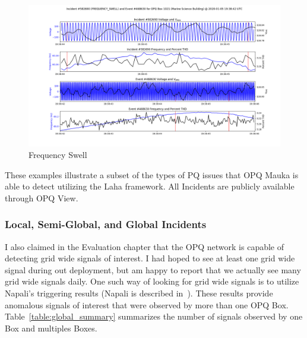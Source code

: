 \begin{figure}[H]
    \centering
    \includegraphics[width=\linewidth]{figures/incident-582690.png}
    \caption{Frequency Swell}
    \label{fig:fswell}
\end{figure}

These examples illustrate a subset of the types of PQ issues that OPQ Mauka is able to detect utilizing the Laha framework. All Incidents are publicly available through OPQ View.

\subsubsection{Local, Semi-Global, and Global Incidents}

I also claimed in the Evaluation chapter that the OPQ network is capable of detecting grid wide signals of interest. I had hoped to see at least one grid wide signal during out deployment, but am happy to report that we actually see many grid wide signals daily. One such way of looking for grid wide signals is to utilize Napali's triggering results (Napali is described in~\cite{napali}). These results provide anomalous signals of interest that were observed by more than one OPQ Box. Table~\ref{table:global_summary} summarizes the number of signals observed by one Box and multiples Boxes.


